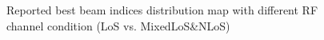 \documentclass[conference, 10pt]{IEEEtran}
\begin{document}
\begin{figure}[t]
\begin{center}
{	%
		\label{fig:beam_map_cdf3}}
	\caption{Reported best beam indices distribution map \label{fig:leapperf} with different RF channel condition (LoS vs. MixedLoS&NLoS)}
	\end{center}
	\end{figure}
\end{document}
